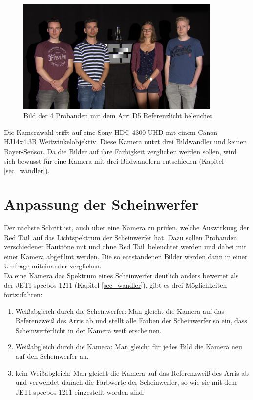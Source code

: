 \begin{figure}[H]     %
\centering
\includegraphics[width=0.9\textwidth]{bilder/umfrage1} 
\caption {Bild der 4 Probanden mit dem Arri D5 Referenzlicht beleuchet}\label{b_umfrage1}
\end{figure}

\noindent Die Kamerawahl trifft auf eine Sony HDC-4300 UHD mit einem Canon HJ14x4.3B Weitwinkelobjektiv. Diese Kamera nutzt drei Bildwandler und keinen Bayer-Sensor. Da die Bilder auf ihre Farbigkeit verglichen werden sollen, wird sich bewusst für eine Kamera mit drei Bildwandlern entschieden (Kapitel \ref{sec_wandler}).\\

\section{Anpassung der Scheinwerfer}

Der nächste Schritt ist, auch über eine Kamera zu prüfen, welche Auswirkung der \glqq Red Tail\grqq\ auf das Lichtspektrum der Scheinwerfer hat. Dazu sollen Probanden verschiedener Hauttöne mit und ohne \glqq Red Tail\grqq\ beleuchtet werden und dabei mit einer Kamera abgefilmt werden. Die so entstandenen Bilder werden dann in einer Umfrage miteinander verglichen.\\
Da eine Kamera das Spektrum eines Scheinwerfer deutlich anders bewertet als der JETI specbos 1211 (Kapitel \ref{sec_wandler}), gibt es drei Möglichkeiten fortzufahren:

\begin{enumerate}\setlength{\itemsep}{0ex}
\item Weißabgleich durch die Scheinwerfer: Man gleicht die Kamera auf das Referenzweiß des Arris ab und stellt alle Farben der Scheinwerfer so ein, dass Scheinwerferlicht in der Kamera weiß erscheinen.
\item Weißabgleich durch die Kamera: Man gleicht für jedes Bild die Kamera neu auf den Scheinwerfer an.
\item kein Weißabgleich: Man gleicht die Kamera auf das Referenzweiß des Arris ab und verwendet danach die Farbwerte der Scheinwerfer, so wie sie mit dem JETI specbos 1211 eingestellt worden sind.
\end{enumerate}


